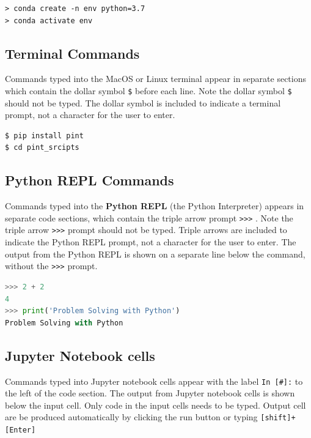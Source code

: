 \documentclass{book}
\begin{document}
\begin{lstlisting}
> conda create -n env python=3.7
> conda activate env
\end{lstlisting}
    




    
        \subsection{Terminal Commands}\label{terminal-commands}

Commands typed into the MacOS or Linux terminal appear in separate
sections which contain the dollar symbol \lstinline!$! before each line.
Note the dollar symbol \lstinline!$! should not be typed. The dollar
symbol is included to indicate a terminal prompt, not a character for
the user to enter.

\begin{lstlisting}
$ pip install pint
$ cd pint_srcipts
\end{lstlisting}
    




    
        \subsection{Python REPL Commands}\label{python-repl-commands}

Commands typed into the \textbf{Python REPL} (the Python Interpreter)
appears in separate code sections, which contain the triple arrow prompt
\lstinline!>>>! . Note the triple arrow \lstinline!>>>! prompt should
not be typed. Triple arrows are included to indicate the Python REPL
prompt, not a character for the user to enter. The output from the
Python REPL is shown on a separate line below the command, without the
\lstinline!>>>! prompt.

\begin{lstlisting}[language=Python]
>>> 2 + 2
4
>>> print('Problem Solving with Python')
Problem Solving with Python
\end{lstlisting}
    




    
        \subsection{Jupyter Notebook cells}\label{jupyter-notebook-cells}

Commands typed into Jupyter notebook cells appear with the label
\lstinline!In [#]:! to the left of the code section. The output from
Jupyter notebook cells is shown below the input cell. Only code in the
input cells needs to be typed. Output cell are be produced automatically
by clicking the run button or typing \lstinline![shift]+[Enter]!
    
\end{document}
